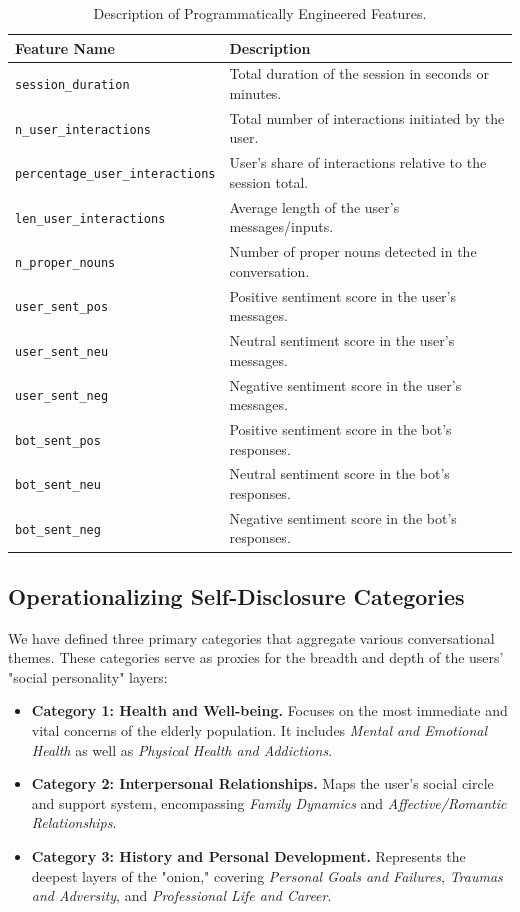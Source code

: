 \begin{table}[htbp]
\centering
\caption{Description of Programmatically Engineered Features.}
\label{tab:programmatic_features}
\begin{tabular}{@{}ll@{}}
\toprule
\textbf{Feature Name} & \textbf{Description}  \\ \midrule
\texttt{session\_duration} & Total duration of the session in seconds or minutes. \\
\texttt{n\_user\_interactions} & Total number of interactions initiated by the user. \\
\texttt{percentage\_user\_interactions} & User's share of interactions relative to the session total.  \\
\texttt{len\_user\_interactions} & Average length of the user's messages/inputs. \\
\texttt{n\_proper\_nouns} & Number of proper nouns detected in the conversation.\\
\texttt{user\_sent\_pos} & Positive sentiment score in the user's messages.\\
\texttt{user\_sent\_neu} & Neutral sentiment score in the user's messages. \\
\texttt{user\_sent\_neg} & Negative sentiment score in the user's messages. \\
\texttt{bot\_sent\_pos} & Positive sentiment score in the bot's responses. \\
\texttt{bot\_sent\_neu} & Neutral sentiment score in the bot's responses. \\
\texttt{bot\_sent\_neg} & Negative sentiment score in the bot's responses. \\ \bottomrule
\end{tabular}
\end{table}
    \subsection{Operationalizing Self-Disclosure Categories}

We have defined three primary categories that aggregate various conversational themes. These categories serve as proxies for the breadth and depth of the users' "social personality" layers:

\begin{itemize}
    \item \textbf{Category 1: Health and Well-being.} Focuses on the most immediate and vital concerns of the elderly population. It includes \textit{Mental and Emotional Health} as well as \textit{Physical Health and Addictions}.
    \item \textbf{Category 2: Interpersonal Relationships.} Maps the user's social circle and support system, encompassing \textit{Family Dynamics} and \textit{Affective/Romantic Relationships}.
    \item \textbf{Category 3: History and Personal Development.} Represents the deepest layers of the "onion," covering \textit{Personal Goals and Failures}, \textit{Traumas and Adversity}, and \textit{Professional Life and Career}.
\end{itemize}

